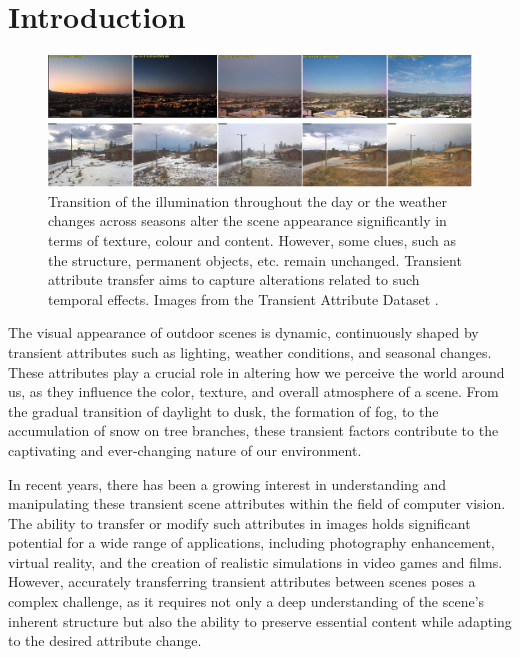 \section{Introduction}\label{sec:zero-shot-intro}


\begin{figure}
  \includegraphics[width=\textwidth]{Chapters/zero-shot-tat-figs/tat-teaser.pdf}
  \caption{Transition of the illumination throughout the day or the weather changes across seasons alter the scene appearance significantly in terms of texture, colour and content. However, some clues, such as the structure, permanent objects, etc. remain unchanged. Transient attribute transfer aims to capture alterations related to such temporal effects. Images from the Transient Attribute Dataset \cite{laffont2014transient}.}
  \label{fig:zero-shot-teaser}
\end{figure}


The visual appearance of outdoor scenes is dynamic, continuously shaped by transient attributes such as lighting, weather conditions, and seasonal changes. These attributes play a crucial role in altering how we perceive the world around us, as they influence the color, texture, and overall atmosphere of a scene. From the gradual transition of daylight to dusk, the formation of fog, to the accumulation of snow on tree branches, these transient factors contribute to the captivating and ever-changing nature of our environment.

In recent years, there has been a growing interest in understanding and manipulating these transient scene attributes within the field of computer vision. The ability to transfer or modify such attributes in images holds significant potential for a wide range of applications, including photography enhancement, virtual reality, and the creation of realistic simulations in video games and films. However, accurately transferring transient attributes between scenes poses a complex challenge, as it requires not only a deep understanding of the scene's inherent structure but also the ability to preserve essential content while adapting to the desired attribute change.

